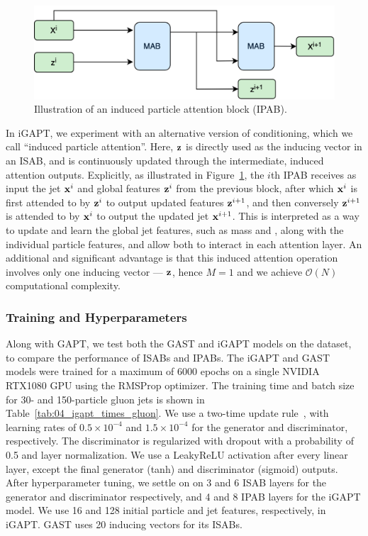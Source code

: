 \begin{figure}[ht!]
    \centering
    \captionsetup{justification=centering}
    \includegraphics[width=0.7\linewidth]{figures/04-ML4Sim/igapt/IPAB.png}
    \caption{Illustration of an induced particle attention block (IPAB).}
    \label{fig:04_igapt_ipab}
\end{figure}

In iGAPT, we experiment with an alternative version of conditioning, which we call ``induced particle attention''.
Here, $\mathbf{z}$ is directly used as the inducing vector in an ISAB, and is continuously updated through the intermediate, induced attention outputs.
Explicitly, as illustrated in Figure~\ref{fig:04_igapt_ipab}, the $i$th IPAB receives as input the jet $\mathbf{x}^{i}$ and global features $\mathbf{z}^{i}$ from the previous block, after which $\mathbf{x}^{i}$ is first attended to by $\mathbf{z}^{i}$ to output updated features $\mathbf{z}^{i+1}$, and then conversely $\mathbf{z}^{i+1}$ is attended to by $\mathbf{x}^{i}$ to output the updated jet $\mathbf{x}^{i+1}$.
This is interpreted as a way to update and learn the global jet features, such as mass and \pt, along with the individual particle features, and allow both to interact in each attention layer.
An additional and significant advantage is that this induced attention operation involves only one inducing vector --- $\mathbf{z}$, hence $M = 1$ and we achieve $\mathcal O(N)$ computational complexity.



\subsubsection{Training and Hyperparameters}

Along with GAPT, we test both the GAST and iGAPT models on the \jetnet dataset, to compare the performance of ISABs and IPABs.
The iGAPT and GAST models were trained for a maximum of 6000 epochs on a single NVIDIA RTX1080 GPU using the RMSProp optimizer.
The training time and batch size for 30- and 150-particle gluon jets is shown in Table~\ref{tab:04_igapt_times_gluon}.
We use a two-time update rule~\cite{TTUR}, with learning rates of $0.5 \times 10^{-4}$ and $1.5 \times 10^{-4}$ for the generator and discriminator, respectively.
The discriminator is regularized with dropout with a probability of 0.5 and layer normalization.
We use a LeakyReLU activation after every linear layer, except the final generator (tanh) and discriminator (sigmoid) outputs.
After hyperparameter tuning, we settle on on 3 and 6 ISAB layers for the generator and discriminator respectively, and 4 and 8 IPAB layers for the iGAPT model.
We use 16 and 128 initial particle and jet features, respectively, in iGAPT.
GAST uses 20 inducing vectors for its ISABs.


